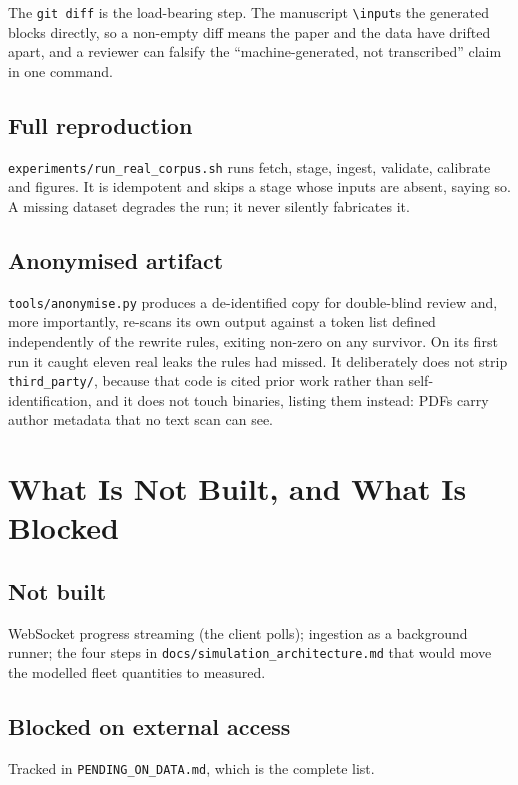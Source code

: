 \documentclass[11pt,a4paper]{article}
\newcommand{\code}[1]{\texttt{#1}}
\begin{document}
The \code{git diff} is the load-bearing step. The manuscript \code{\textbackslash input}s the
generated blocks directly, so a non-empty diff means the paper and the data have
drifted apart, and a reviewer can falsify the ``machine-generated, not
transcribed'' claim in one command.

\subsection{Full reproduction}
\code{experiments/run\_real\_corpus.sh} runs fetch, stage, ingest, validate,
calibrate and figures. It is idempotent and skips a stage whose inputs are
absent, saying so. A missing dataset degrades the run; it never silently
fabricates it.

\subsection{Anonymised artifact}
\code{tools/anonymise.py} produces a de-identified copy for double-blind review
and, more importantly, re-scans its own output against a token list defined
independently of the rewrite rules, exiting non-zero on any survivor. On its
first run it caught eleven real leaks the rules had missed. It deliberately does
not strip \code{third\_party/}, because that code is cited prior work rather
than self-identification, and it does not touch binaries, listing them instead:
PDFs carry author metadata that no text scan can see.

\section{What Is Not Built, and What Is Blocked}

\subsection{Not built}
WebSocket progress streaming (the client polls); ingestion as a background
runner; the four steps in \code{docs/simulation\_architecture.md} that would
move the modelled fleet quantities to measured.

\subsection{Blocked on external access}
Tracked in \code{PENDING\_ON\_DATA.md}, which is the complete list.
\end{document}
